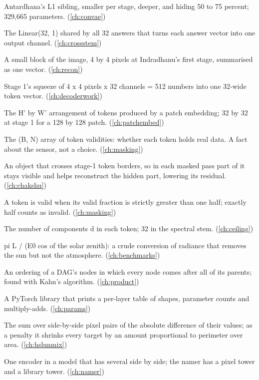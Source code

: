 \begin{description}[style=nextline,leftmargin=1.2em,font=\normalfont\bfseries]
\item[Tirohita] Antardhana's L1 sibling, smaller per stage, deeper, and hiding 50 to 75 percent; 329,665 parameters. (\cref{ch:convae})
\item[To-channel layer] The Linear(32, 1) shared by all 32 answers that turns each answer vector into one output channel. (\cref{ch:crossstem})
\item[Token] A small block of the image, 4 by 4 pixels at Indradhanu's first stage, summarised as one vector. (\cref{ch:recon})
\item[Token bottleneck] Stage 1's squeeze of 4 x 4 pixels x 32 channels = 512 numbers into one 32-wide token vector. (\cref{ch:decoderwork})
\item[Token grid] The H' by W' arrangement of tokens produced by a patch embedding; 32 by 32 at stage 1 for a 128 by 128 patch. (\cref{ch:patchembed})
\item[Token mask] The (B, N) array of token validities: whether each token holds real data. A fact about the sensor, not a choice. (\cref{ch:masking})
\item[Token straddling] An object that crosses stage-1 token borders, so in each masked pass part of it stays visible and helps reconstruct the hidden part, lowering its residual. (\cref{ch:chakshu})
\item[Token validity] A token is valid when its valid fraction is strictly greater than one half; exactly half counts as invalid. (\cref{ch:masking})
\item[Token width] The number of components d in each token; 32 in the spectral stem. (\cref{ch:ceiling})
\item[Top-of-atmosphere reflectance] pi L / (E0 cos of the solar zenith): a crude conversion of radiance that removes the sun but not the atmosphere. (\cref{ch:benchmarks})
\item[Topological order] An ordering of a DAG's nodes in which every node comes after all of its parents; found with Kahn's algorithm. (\cref{ch:product})
\item[torchinfo] A PyTorch library that prints a per-layer table of shapes, parameter counts and multiply-adds. (\cref{ch:params})
\item[Total variation] The sum over side-by-side pixel pairs of the absolute difference of their values; as a penalty it shrinks every target by an amount proportional to perimeter over area. (\cref{ch:hslunmix})
\item[Tower] One encoder in a model that has several side by side; the namer has a pixel tower and a library tower. (\cref{ch:namer})

\end{description}
